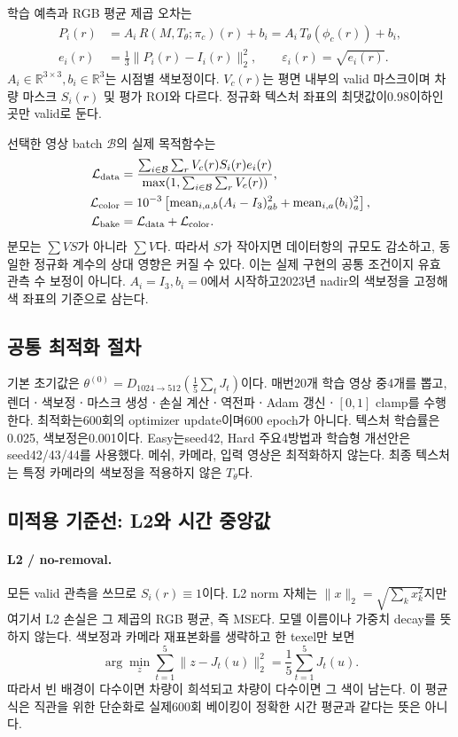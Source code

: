 \documentclass[11pt,a4paper]{article}
\newcommand{\mean}{\operatorname{mean}}
\newcommand{\calB}{\mathcal{B}}
\begin{document}
학습 예측과 RGB 평균 제곱 오차는
\begin{align}
 P_i(r)&=A_i\,R(M,T_\theta;\pi_c)(r)+b_i
        =A_i\,T_\theta(\phi_c(r))+b_i,\\
 e_i(r)&=\frac{1}{3}\|P_i(r)-I_i(r)\|_2^2,\qquad
 \varepsilon_i(r)=\sqrt{e_i(r)}.
\end{align}
$A_i\in\mathbb R^{3\times3},b_i\in\mathbb R^3$는 시점별 색보정이다. $V_c(r)$는 평면 내부의 valid 마스크이며 차량 마스크 $S_i(r)$ 및 평가 ROI와 다르다. 정규화 텍스처 좌표의 최댓값이0.98이하인 곳만 valid로 둔다.

선택한 영상 batch $\calB$의 실제 목적함수는
\begin{align}
 \mathcal L_{\rm data}
 &=\frac{\sum_{i\in\calB}\sum_r V_c(r)S_i(r)e_i(r)}
         {\max(1,\sum_{i\in\calB}\sum_r V_c(r))},\label{eq:data}\\
 \mathcal L_{\rm color}
 &=10^{-3}\left[\mean_{i,a,b}(A_i-I_3)_{ab}^2+
                       \mean_{i,a}(b_i)_a^2\right],\\
 \mathcal L_{\rm bake}&=\mathcal L_{\rm data}+\mathcal L_{\rm color}.
\end{align}
분모는 $\sum VS$가 아니라 $\sum V$다. 따라서 $S$가 작아지면 데이터항의 규모도 감소하고, 동일한 정규화 계수의 상대 영향은 커질 수 있다. 이는 실제 구현의 공통 조건이지 유효 관측 수 보정이 아니다. $A_i=I_3,b_i=0$에서 시작하고2023년 nadir의 색보정을 고정해 색 좌표의 기준으로 삼는다.

\subsection{공통 최적화 절차}
기본 초기값은 $\theta^{(0)}=D_{1024\to512}(\frac15\sum_tJ_t)$이다. 매번20개 학습 영상 중4개를 뽑고, 렌더ㆍ색보정ㆍ마스크 생성ㆍ손실 계산ㆍ역전파ㆍAdam 갱신ㆍ$[0,1]$ clamp를 수행한다. 최적화는600회의 optimizer update이며600 epoch가 아니다. 텍스처 학습률은0.025, 색보정은0.001이다. Easy는seed42, Hard 주요4방법과 학습형 개선안은seed42/43/44를 사용했다. 메쉬, 카메라, 입력 영상은 최적화하지 않는다. 최종 텍스처는 특정 카메라의 색보정을 적용하지 않은 $T_\theta$다.

\subsection{미적용 기준선: L2와 시간 중앙값}
\paragraph{L2 / no-removal.}
모든 valid 관측을 쓰므로 $S_i(r)\equiv1$이다. L2 norm 자체는 $\|x\|_2=\sqrt{\sum_kx_k^2}$지만 여기서 L2 손실은 그 제곱의 RGB 평균, 즉 MSE다. 모델 이름이나 가중치 decay를 뜻하지 않는다. 색보정과 카메라 재표본화를 생략하고 한 texel만 보면
\begin{equation}
 \arg\min_z\sum_{t=1}^5\|z-J_t(u)\|_2^2
 =\frac15\sum_{t=1}^5J_t(u).
\end{equation}
따라서 빈 배경이 다수이면 차량이 희석되고 차량이 다수이면 그 색이 남는다. 이 평균식은 직관을 위한 단순화로 실제600회 베이킹이 정확한 시간 평균과 같다는 뜻은 아니다.
\end{document}
